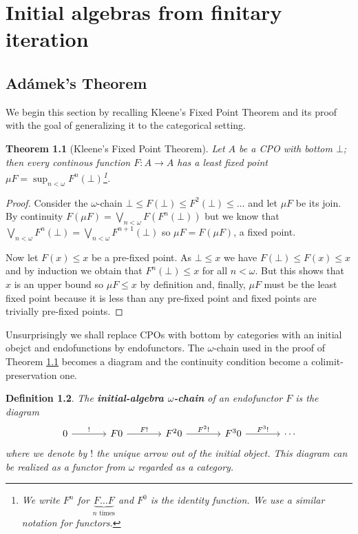 \documentclass[letterpaper, 11pt, oneside]{memoir}
\theoremstyle{myteo}
\newtheorem{theorem}{Theorem}[section]
\newtheorem{definition}[theorem]{Definition}
\numberwithin{equation}{section}
\newcommand{\marginnote}[1]{\marginpar{\footnotesize #1}}
\begin{document}
\chapter{Initial algebras from finitary iteration}
\newpage

\section{Adámek's Theorem}

We begin this section by recalling Kleene's Fixed Point Theorem and its proof with the goal of generalizing it to the categorical setting.

\begin{theorem}[Kleene's Fixed Point Theorem]
  \label{teo:kleene}
  Let \(A\) be a CPO with bottom \(\bot\); then every continous function \(F \colon A \to A\) has a least fixed point \(\mu F = \sup_{n < \omega}F^n(\bot)\)\footnote{We write \(F^n\) for \(\underbrace{F \ldots F}_{n \text{ times}}\) and \(F^0\) is the identity function. We use a similar notation for functors.}.
\end{theorem}

\begin{proof}
  Consider the \(\omega\)-chain \(\bot \leq F(\bot) \leq F^2(\bot) \leq \ldots\) and let \(\mu F\) be its join.
  By continuity \(F(\mu F) = \bigvee_{n < \omega}F(F^n(\bot))\) but we know that \(\bigvee_{n < \omega}F^n(\bot) = \bigvee_{n < \omega}F^{n+1}(\bot)\) so \(\mu F = F(\mu F)\), a fixed point.

  Now let \(F(x) \leq x\) be a pre-fixed point.
  As \(\bot \leq x\) we have \(F(\bot) \leq F(x) \leq x\) and by induction we obtain that \(F^n(\bot) \leq x\) for all \(n < \omega\).
  But this shows that \(x\) is an upper bound so \(\mu F \leq x\) by definition and, finally, \(\mu F\) must be the least fixed point because it is less than any pre-fixed point and fixed points are trivially pre-fixed points.
\end{proof}

Unsurprisingly we shall replace CPOs with bottom by categories with an initial obejct and endofunctions by endofunctors.
The \(\omega\)-chain used in the proof of Theorem \ref{teo:kleene} becomes a diagram and the continuity condition become a colimit-preservation one.

\begin{definition}
  The \textbf{initial-algebra \(\omega\)-chain}\marginnote{initial-algebra \(\omega\)-chain} of an endofunctor \(F\) is the diagram
  \begin{equation}
    \label{dia:initial_chain}
    \begin{tikzcd}[sep = large]
      0 \ar[r, "!"] & F0 \ar[r, "F!"] & F^20 \ar[r, "F^2!"] & F^30 \ar[r, "F^3!"] & \cdots
    \end{tikzcd}
  \end{equation}
  where we denote by \(!\) the unique arrow out of the initial object.
  This diagram can be realized as a functor from \(\omega\) regarded as a category.
\end{definition}
\end{document}
